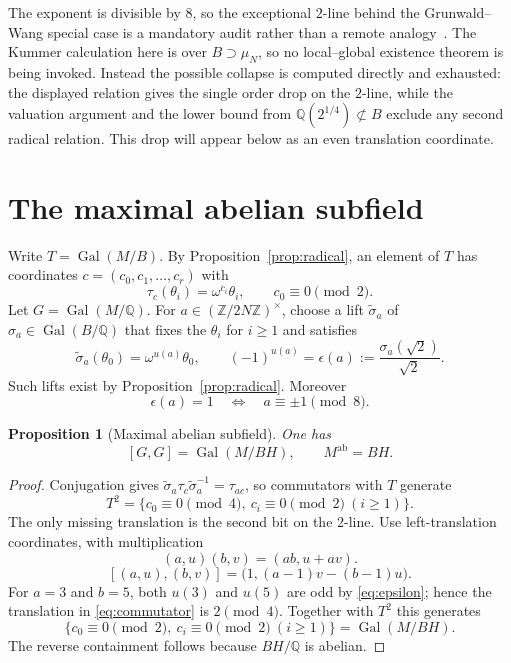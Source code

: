 \documentclass[11pt]{article}
\newtheorem{proposition}[theorem]{Proposition}
\theoremstyle{definition}
\theoremstyle{remark}
\newcommand{\Z}{\mathbb Z}
\newcommand{\Q}{\mathbb Q}
\newcommand{\Gal}{\operatorname{Gal}}
\begin{document}
The exponent is divisible by $8$, so the exceptional $2$-line behind the
Grunwald--Wang special case is a mandatory audit rather than a remote
analogy~\cite{Wang}.  The Kummer calculation here is over
$B\supset\mu_N$, so no local--global existence theorem is being invoked.
Instead the possible collapse is computed directly and exhausted: the
displayed relation gives the single order drop on the $2$-line, while the
valuation argument and the lower bound from
$\Q(2^{1/4})\not\subset B$ exclude any second radical relation.  This drop
will appear below as an even translation coordinate.

\section{The maximal abelian subfield}

Write $T=\Gal(M/B)$.  By Proposition~\ref{prop:radical}, an element of $T$
has coordinates $c=(c_0,c_1,\ldots,c_r)$ with
\[
  \tau_c(\theta_i)=\omega^{c_i}\theta_i,
  \qquad c_0\equiv0\pmod2.
\]
Let $G=\Gal(M/\Q)$.  For $a\in(\Z/2N\Z)^\times$, choose a lift
$\widetilde\sigma_a$ of $\sigma_a\in\Gal(B/\Q)$ that fixes the
$\theta_i$ for $i\ge1$ and satisfies
\[
  \widetilde\sigma_a(\theta_0)=\omega^{u(a)}\theta_0,
  \qquad (-1)^{u(a)}=\epsilon(a):=\frac{\sigma_a(\sqrt2)}{\sqrt2}.
\]
Such lifts exist by Proposition~\ref{prop:radical}.  Moreover
\begin{equation}\label{eq:epsilon}
  \epsilon(a)=1\quad\Longleftrightarrow\quad a\equiv\pm1\pmod8.
\end{equation}

\begin{proposition}[Maximal abelian subfield]\label{prop:ab}
One has
\[
  [G,G]=\Gal(M/BH),\qquad M^{\mathrm{ab}}=BH.
\]
\end{proposition}

\begin{proof}
Conjugation gives
$\widetilde\sigma_a\tau_c\widetilde\sigma_a^{-1}=\tau_{ac}$, so
commutators with $T$ generate
\[
  T^2=\{c_0\equiv0\pmod4,\ c_i\equiv0\pmod2\ (i\ge1)\}.
\]
The only missing translation is the second bit on the $2$-line.  Use
left-translation coordinates, with multiplication
\[
  (a,u)(b,v)=(ab,u+av).
\]
\begin{equation}\label{eq:commutator}
 [(a,u),(b,v)]=\bigl(1,(a-1)v-(b-1)u\bigr).
\end{equation}
For $a=3$ and $b=5$, both $u(3)$ and $u(5)$ are odd by
\eqref{eq:epsilon}; hence the translation in \eqref{eq:commutator} is
$2\pmod4$.  Together with $T^2$ this generates
\[
  \{c_0\equiv0\pmod2,\ c_i\equiv0\pmod2\ (i\ge1)\}
  =\Gal(M/BH).
\]
The reverse containment follows because $BH/\Q$ is abelian.
\end{proof}
\end{document}
